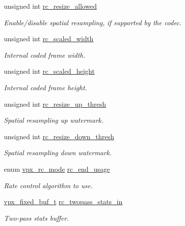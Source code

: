 \begin{DoxyCompactItemize}
unsigned int \hyperlink{structvpx__codec__enc__cfg_a02a4e2f18fb0fdfff44df8b0d9a99d6c}{rc\+\_\+resize\+\_\+allowed}
\begin{DoxyCompactList}\small\item\em Enable/disable spatial resampling, if supported by the codec. \end{DoxyCompactList}\item 
unsigned int \hyperlink{structvpx__codec__enc__cfg_a2edc2097b6c74f837f129d3cc8901fca}{rc\+\_\+scaled\+\_\+width}
\begin{DoxyCompactList}\small\item\em Internal coded frame width. \end{DoxyCompactList}\item 
unsigned int \hyperlink{structvpx__codec__enc__cfg_a5586418c28a5f7f327c4ba7567467243}{rc\+\_\+scaled\+\_\+height}
\begin{DoxyCompactList}\small\item\em Internal coded frame height. \end{DoxyCompactList}\item 
unsigned int \hyperlink{structvpx__codec__enc__cfg_a855599c0660f31dfcab4a64996b4f6ad}{rc\+\_\+resize\+\_\+up\+\_\+thresh}
\begin{DoxyCompactList}\small\item\em Spatial resampling up watermark. \end{DoxyCompactList}\item 
unsigned int \hyperlink{structvpx__codec__enc__cfg_a1be7bd7b0eaf1e99b5e4028c37c65488}{rc\+\_\+resize\+\_\+down\+\_\+thresh}
\begin{DoxyCompactList}\small\item\em Spatial resampling down watermark. \end{DoxyCompactList}\item 
enum \hyperlink{group__encoder_gaf50e74d91be4cae6f70dfeba5b7410d2}{vpx\+\_\+rc\+\_\+mode} \hyperlink{structvpx__codec__enc__cfg_a99c415edb6c6f909a095a57c3430a116}{rc\+\_\+end\+\_\+usage}
\begin{DoxyCompactList}\small\item\em Rate control algorithm to use. \end{DoxyCompactList}\item 
\hyperlink{group__encoder_ga21fab7dd28065f349c97165501223764}{vpx\+\_\+fixed\+\_\+buf\+\_\+t} \hyperlink{structvpx__codec__enc__cfg_a1bd769247042e5806295f6e06d20f008}{rc\+\_\+twopass\+\_\+stats\+\_\+in}
\begin{DoxyCompactList}\small\item\em Two-\/pass stats buffer. \end{DoxyCompactList}\item 

\end{DoxyCompactItemize}
